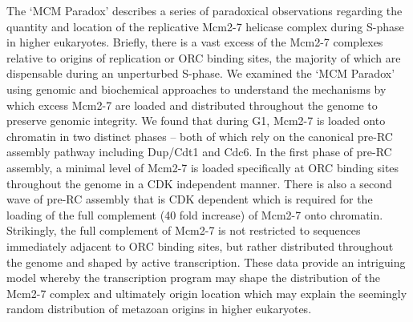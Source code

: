 The `MCM Paradox' describes a %
series of %
paradoxical observations regarding the quantity and location of the replicative Mcm2-7 helicase complex during S-phase in higher eukaryotes\citep{Takahashi2005-bz}. Briefly, there is a vast excess of the Mcm2-7 complexes relative to origins of replication or ORC binding sites, the majority of which are %
dispensable during an unperturbed S-phase. We examined the `MCM Paradox'  using  genomic and biochemical approaches  to understand the mechanisms by which excess Mcm2-7 are loaded and distributed throughout the genome to preserve genomic integrity\citep{Powell2015-af}.  We found that during G1, Mcm2-7 is loaded onto chromatin in two distinct phases -- both of which rely on the canonical pre-RC assembly pathway including Dup/Cdt1 and Cdc6.  In the first phase of pre-RC assembly, a minimal level of Mcm2-7 is loaded specifically at ORC binding sites throughout the genome in a CDK independent manner.  There is also a second wave of pre-RC assembly that is CDK dependent which is required for the loading of the full complement (40 fold increase) of Mcm2-7 onto chromatin.  Strikingly, the full complement of Mcm2-7 is not restricted to sequences immediately adjacent to ORC binding sites, but rather distributed throughout the genome and shaped by active transcription.  %
These data provide an intriguing model whereby the transcription program may shape the distribution of the Mcm2-7 complex and ultimately origin location which may explain the seemingly random distribution of metazoan origins in higher eukaryotes\citep{Petryk2016-rr}.

